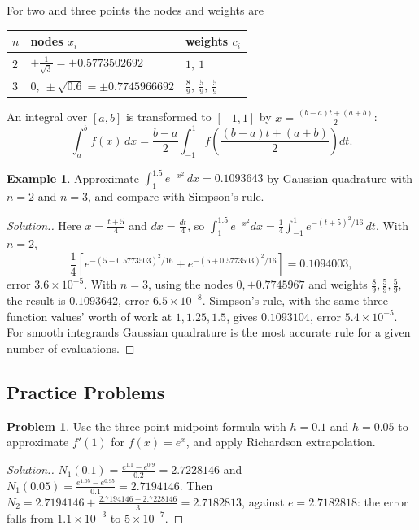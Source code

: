 \documentclass[11pt,a4paper]{article}
\numberwithin{equation}{section}
\theoremstyle{definition}
\newtheorem{exa}[thm]{Example}
\newtheorem{problemx}{Problem}[subsection]
\newenvironment{problem}{\begin{problemx}}{\end{problemx}}
\newenvironment{solution}
  {\renewcommand{\qedsymbol}{}\begin{proof}[\textit{Solution}.]}
  {\end{proof}}
\begin{document}
For two and three points the nodes and weights are
\begin{center}
\begin{tabular}{lll}
\hline
$n$ & nodes $x_i$ & weights $c_i$\\
\hline
$2$ & $\pm\frac{1}{\sqrt3} = \pm0.5773502692$ & $1,\ 1$\\
$3$ & $0,\ \pm\sqrt{0.6} = \pm0.7745966692$ & $\frac89,\ \frac59,\ \frac59$\\
\hline
\end{tabular}
\end{center}
An integral over $[a,b]$ is transformed to $[-1,1]$ by $x = \frac{(b-a)t+(a+b)}{2}$:
$$\int_a^bf(x)\,dx = \frac{b-a}{2}\int_{-1}^1f\!\left(\frac{(b-a)t+(a+b)}{2}\right)dt .$$

\begin{exa}
\label{exa:gaussquad}
Approximate $\int_1^{1.5}e^{-x^2}\,dx = 0.1093643$ by Gaussian quadrature with $n = 2$ and $n = 3$, and compare with Simpson's rule.
\end{exa}

\begin{solution}
Here $x = \frac{t+5}{4}$ and $dx = \frac{dt}{4}$, so $\int_1^{1.5}e^{-x^2}dx = \frac14\int_{-1}^1e^{-(t+5)^2/16}\,dt$. With $n = 2$,
$$\frac14\left[e^{-(5-0.5773503)^2/16}+e^{-(5+0.5773503)^2/16}\right] = 0.1094003,$$
error $3.6\times10^{-5}$. With $n = 3$, using the nodes $0,\pm0.7745967$ and weights $\frac89,\frac59,\frac59$, the result is $0.1093642$, error
$6.5\times10^{-8}$. Simpson's rule, with the same three function values' worth of work at $1, 1.25, 1.5$, gives $0.1093104$, error
$5.4\times10^{-5}$. For smooth integrands Gaussian quadrature is the most accurate rule for a given number of evaluations.
\end{solution}


\subsection{Practice Problems}

\begin{problem}
Use the three-point midpoint formula with $h = 0.1$ and $h = 0.05$ to approximate $f'(1)$ for $f(x) = e^x$, and apply Richardson
extrapolation.
\end{problem}
\begin{solution}
$N_1(0.1) = \frac{e^{1.1}-e^{0.9}}{0.2} = 2.7228146$ and $N_1(0.05) = \frac{e^{1.05}-e^{0.95}}{0.1} = 2.7194146$. Then $N_2 = 2.7194146+\frac{2.7194146-2.7228146}{3}
= 2.7182813$, against $e = 2.7182818$: the error falls from $1.1\times10^{-3}$ to $5\times10^{-7}$.
\end{solution}
\end{document}
